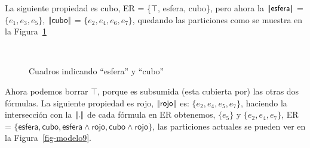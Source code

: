 La siguiente propiedad es \textsf{cubo}, ER = \{$\top$, \textsf{esfera}, \textsf{cubo}\}, pero ahora la $|\!|\textsf{esfera}|\!|$ = $\{e_1, e_3, e_5\}$, $|\!|\textsf{cubo}|\!|$ = $\{e_2, e_4, e_6, e_7\}$, quedando las particiones como se muestra en la Figura~\ref{fig-modelo4}

%

\begin{figure}[ht]
\begin{center}
\\[0pt]
\caption{Cuadros indicando ``esfera'' y ``cubo''}
\label{fig-modelo4}
\end{center}
\end{figure}
Ahora podemos borrar $\top$, porque es subsumida (esta cubierta por) las otras dos f\'ormulas. La siguiente propiedad es  \textsf{rojo}, $|\!|\textsf{rojo}|\!|$ es: $\{e_2, e_4, e_5, e_7\}$, haciendo la intersecci\'on con la $|\!|.|\!|$ de cada f\'ormula en ER obtenemos, $\{e_5\}$ y $\{e_2, e_4, e_7\}$, ER = $\{\textsf{esfera}, \textsf{cubo}, \textsf{esfera} \wedge \textsf{rojo}, \textsf{cubo} \wedge \textsf{rojo}\}$, las particiones actuales se pueden ver en la Figura~\ref{fig-modelo9}.

%

